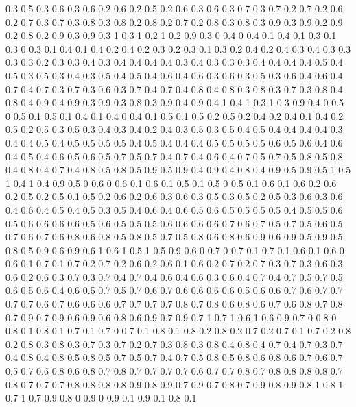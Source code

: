 0.3 0.5
0.3 0.6
0.3 0.6
0.2 0.6
0.2 0.5
0.2 0.6
0.3 0.6
0.3 0.7
0.3 0.7
0.2 0.7
0.2 0.6
0.2 0.7
0.3 0.7
0.3 0.8
0.3 0.8
0.2 0.8
0.2 0.7
0.2 0.8
0.3 0.8
0.3 0.9
0.3 0.9
0.2 0.9
0.2 0.8
0.2 0.9
0.3 0.9
0.3 1
0.3 1
0.2 1
0.2 0.9
0.3 0
0.4 0
0.4 0.1
0.4 0.1
0.3 0.1
0.3 0
0.3 0.1
0.4 0.1
0.4 0.2
0.4 0.2
0.3 0.2
0.3 0.1
0.3 0.2
0.4 0.2
0.4 0.3
0.4 0.3
0.3 0.3
0.3 0.2
0.3 0.3
0.4 0.3
0.4 0.4
0.4 0.4
0.3 0.4
0.3 0.3
0.3 0.4
0.4 0.4
0.4 0.5
0.4 0.5
0.3 0.5
0.3 0.4
0.3 0.5
0.4 0.5
0.4 0.6
0.4 0.6
0.3 0.6
0.3 0.5
0.3 0.6
0.4 0.6
0.4 0.7
0.4 0.7
0.3 0.7
0.3 0.6
0.3 0.7
0.4 0.7
0.4 0.8
0.4 0.8
0.3 0.8
0.3 0.7
0.3 0.8
0.4 0.8
0.4 0.9
0.4 0.9
0.3 0.9
0.3 0.8
0.3 0.9
0.4 0.9
0.4 1
0.4 1
0.3 1
0.3 0.9
0.4 0
0.5 0
0.5 0.1
0.5 0.1
0.4 0.1
0.4 0
0.4 0.1
0.5 0.1
0.5 0.2
0.5 0.2
0.4 0.2
0.4 0.1
0.4 0.2
0.5 0.2
0.5 0.3
0.5 0.3
0.4 0.3
0.4 0.2
0.4 0.3
0.5 0.3
0.5 0.4
0.5 0.4
0.4 0.4
0.4 0.3
0.4 0.4
0.5 0.4
0.5 0.5
0.5 0.5
0.4 0.5
0.4 0.4
0.4 0.5
0.5 0.5
0.5 0.6
0.5 0.6
0.4 0.6
0.4 0.5
0.4 0.6
0.5 0.6
0.5 0.7
0.5 0.7
0.4 0.7
0.4 0.6
0.4 0.7
0.5 0.7
0.5 0.8
0.5 0.8
0.4 0.8
0.4 0.7
0.4 0.8
0.5 0.8
0.5 0.9
0.5 0.9
0.4 0.9
0.4 0.8
0.4 0.9
0.5 0.9
0.5 1
0.5 1
0.4 1
0.4 0.9
0.5 0
0.6 0
0.6 0.1
0.6 0.1
0.5 0.1
0.5 0
0.5 0.1
0.6 0.1
0.6 0.2
0.6 0.2
0.5 0.2
0.5 0.1
0.5 0.2
0.6 0.2
0.6 0.3
0.6 0.3
0.5 0.3
0.5 0.2
0.5 0.3
0.6 0.3
0.6 0.4
0.6 0.4
0.5 0.4
0.5 0.3
0.5 0.4
0.6 0.4
0.6 0.5
0.6 0.5
0.5 0.5
0.5 0.4
0.5 0.5
0.6 0.5
0.6 0.6
0.6 0.6
0.5 0.6
0.5 0.5
0.5 0.6
0.6 0.6
0.6 0.7
0.6 0.7
0.5 0.7
0.5 0.6
0.5 0.7
0.6 0.7
0.6 0.8
0.6 0.8
0.5 0.8
0.5 0.7
0.5 0.8
0.6 0.8
0.6 0.9
0.6 0.9
0.5 0.9
0.5 0.8
0.5 0.9
0.6 0.9
0.6 1
0.6 1
0.5 1
0.5 0.9
0.6 0
0.7 0
0.7 0.1
0.7 0.1
0.6 0.1
0.6 0
0.6 0.1
0.7 0.1
0.7 0.2
0.7 0.2
0.6 0.2
0.6 0.1
0.6 0.2
0.7 0.2
0.7 0.3
0.7 0.3
0.6 0.3
0.6 0.2
0.6 0.3
0.7 0.3
0.7 0.4
0.7 0.4
0.6 0.4
0.6 0.3
0.6 0.4
0.7 0.4
0.7 0.5
0.7 0.5
0.6 0.5
0.6 0.4
0.6 0.5
0.7 0.5
0.7 0.6
0.7 0.6
0.6 0.6
0.6 0.5
0.6 0.6
0.7 0.6
0.7 0.7
0.7 0.7
0.6 0.7
0.6 0.6
0.6 0.7
0.7 0.7
0.7 0.8
0.7 0.8
0.6 0.8
0.6 0.7
0.6 0.8
0.7 0.8
0.7 0.9
0.7 0.9
0.6 0.9
0.6 0.8
0.6 0.9
0.7 0.9
0.7 1
0.7 1
0.6 1
0.6 0.9
0.7 0
0.8 0
0.8 0.1
0.8 0.1
0.7 0.1
0.7 0
0.7 0.1
0.8 0.1
0.8 0.2
0.8 0.2
0.7 0.2
0.7 0.1
0.7 0.2
0.8 0.2
0.8 0.3
0.8 0.3
0.7 0.3
0.7 0.2
0.7 0.3
0.8 0.3
0.8 0.4
0.8 0.4
0.7 0.4
0.7 0.3
0.7 0.4
0.8 0.4
0.8 0.5
0.8 0.5
0.7 0.5
0.7 0.4
0.7 0.5
0.8 0.5
0.8 0.6
0.8 0.6
0.7 0.6
0.7 0.5
0.7 0.6
0.8 0.6
0.8 0.7
0.8 0.7
0.7 0.7
0.7 0.6
0.7 0.7
0.8 0.7
0.8 0.8
0.8 0.8
0.7 0.8
0.7 0.7
0.7 0.8
0.8 0.8
0.8 0.9
0.8 0.9
0.7 0.9
0.7 0.8
0.7 0.9
0.8 0.9
0.8 1
0.8 1
0.7 1
0.7 0.9
0.8 0
0.9 0
0.9 0.1
0.9 0.1
0.8 0.1
